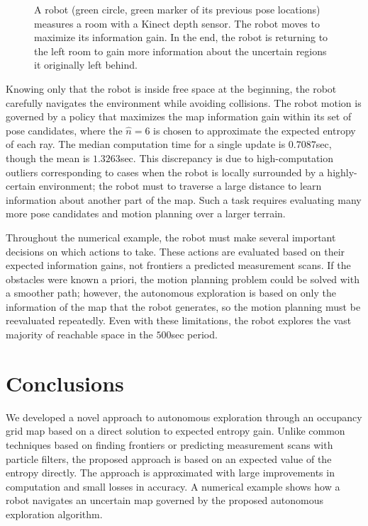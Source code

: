 \documentclass[letterpaper, 10pt]{ieeeconf}
\begin{document}
\begin{figure}
{{	}
}
\caption{A robot (green circle, green marker of its previous pose locations) measures a room with a Kinect depth sensor. The robot moves to maximize its information gain. In the end, the robot is returning to the left room to gain more information about the uncertain regions it originally left behind.%
}
\label{fig:AutonomousExploration}
\end{figure}

Knowing only that the robot is inside free space at the beginning, the robot carefully navigates the environment while avoiding collisions. The robot motion is governed by a policy that maximizes the map information gain within its set of pose candidates, where the $\hat n=6$ is chosen to approximate the expected entropy of each ray. The median computation time for a single update is $0.7087$sec, though the mean is $1.3263$sec. This discrepancy is due to high-computation outliers corresponding to cases when the robot is locally surrounded by a highly-certain environment; the robot must to traverse a large distance to learn information about another part of the map. Such a task requires evaluating many more pose candidates and motion planning over a larger terrain. 

Throughout the numerical example, the robot must make several important decisions on which actions to take. These actions are evaluated based on their expected information gains, not frontiers a predicted measurement scans. If the obstacles were known a priori, the motion planning problem could be solved with a smoother path; however, the autonomous exploration is based on only the information of the map that the robot generates, so the motion planning must be reevaluated repeatedly. Even with these limitations, the robot explores the vast majority of reachable space in the $500$sec period. 


\section{Conclusions}

We developed a novel approach to autonomous exploration through an occupancy grid map based on a direct solution to expected entropy gain. Unlike common techniques based on finding frontiers or predicting measurement scans with particle filters, the proposed approach is based on an expected value of the entropy directly. The approach is approximated with large improvements in computation and small losses in accuracy. A numerical example shows how a robot navigates an uncertain map governed by the proposed autonomous exploration algorithm.
\end{document}
